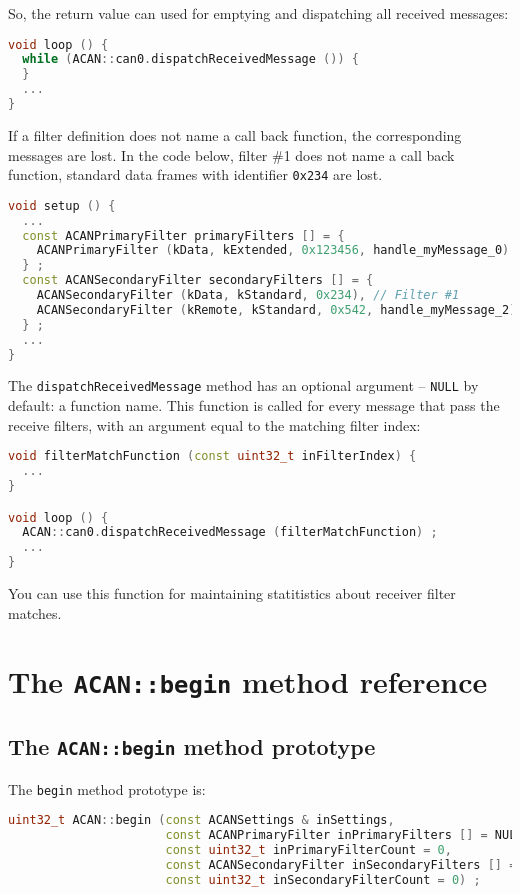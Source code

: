 \documentclass[9pt, a4paper, obeyspaces, openany]{extarticle}
\newcommand \sectionLabel[2]{\section{#1}\label{sec:#2}}
\begin{document}
So, the return value can used for emptying and dispatching all received messages:
{ \small\begin{lstlisting}[language=c++]
void loop () {
  while (ACAN::can0.dispatchReceivedMessage ()) {
  }
  ...
}
\end{lstlisting}}

If a filter definition does not name a call back function, the corresponding messages are lost. In the code below, filter \#1 does not name a call back function, standard data frames with identifier \texttt{0x234} are lost.

{ \small\begin{lstlisting}[language=c++]
void setup () {
  ...
  const ACANPrimaryFilter primaryFilters [] = {
    ACANPrimaryFilter (kData, kExtended, 0x123456, handle_myMessage_0)
  } ;
  const ACANSecondaryFilter secondaryFilters [] = {
    ACANSecondaryFilter (kData, kStandard, 0x234), // Filter #1
    ACANSecondaryFilter (kRemote, kStandard, 0x542, handle_myMessage_2)
  } ;
  ...
}
\end{lstlisting}}


The \texttt{dispatchReceivedMessage} method has an optional argument -- \texttt{NULL} by default: a function name. This function is called for every message that pass the receive filters, with an argument equal to the matching filter index:

{ \small\begin{lstlisting}[language=c++]
void filterMatchFunction (const uint32_t inFilterIndex) {
  ...
}

void loop () {
  ACAN::can0.dispatchReceivedMessage (filterMatchFunction) ;
  ...
}
\end{lstlisting}}

You can use this function for maintaining statitistics about receiver filter matches.


\sectionLabel{The \texttt{ACAN::begin} method reference}{beginMethodReference}

\subsection{The \texttt{ACAN::begin} method prototype}

The \texttt{begin} method prototype is:
{ \small\begin{lstlisting}[language=c++]
uint32_t ACAN::begin (const ACANSettings & inSettings,
                      const ACANPrimaryFilter inPrimaryFilters [] = NULL,
                      const uint32_t inPrimaryFilterCount = 0,
                      const ACANSecondaryFilter inSecondaryFilters [] = NULL,
                      const uint32_t inSecondaryFilterCount = 0) ;
\end{lstlisting}}
\end{document}
